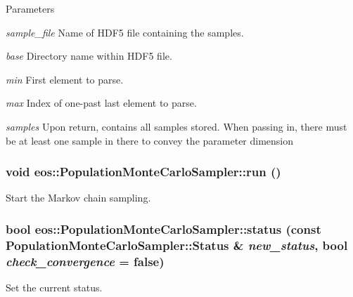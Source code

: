 \begin{DoxyParams}{Parameters}
\item[{\em sample\_\-file}]Name of HDF5 file containing the samples. \item[{\em base}]Directory name within HDF5 file. \item[{\em min}]First element to parse. \item[{\em max}]Index of one-\/past last element to parse. \item[{\em samples}]Upon return, contains all samples stored. When passing in, there must be at least one sample in there to convey the parameter dimension \end{DoxyParams}
\hypertarget{classeos_1_1PopulationMonteCarloSampler_a7df73b99d042f2b41a37e9acca29eebd}{
\subsubsection[{run}]{\setlength{\rightskip}{0pt plus 5cm}void eos::PopulationMonteCarloSampler::run ()}}
\label{classeos_1_1PopulationMonteCarloSampler_a7df73b99d042f2b41a37e9acca29eebd}


Start the Markov chain sampling. \hypertarget{classeos_1_1PopulationMonteCarloSampler_a96d11e8d79528f5ea69f0c243dbf659f}{
\subsubsection[{status}]{\setlength{\rightskip}{0pt plus 5cm}bool eos::PopulationMonteCarloSampler::status (const {\bf PopulationMonteCarloSampler::Status} \& {\em new\_\-status}, \/  bool {\em check\_\-convergence} = {\ttfamily false})}}
\label{classeos_1_1PopulationMonteCarloSampler_a96d11e8d79528f5ea69f0c243dbf659f}
Set the current status.


